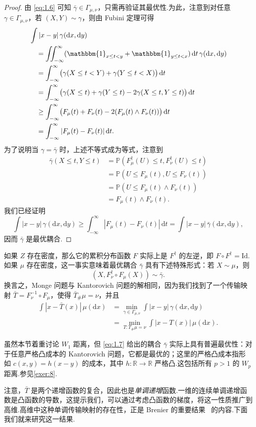 \begin{proof}
由 \eqref{eq:1.6} 可知 $\bar\gamma\in\Gamma_{\mu,\nu}$，只需再验证其最优性.为此，注意到对任意 $\gamma\in\Gamma_{\mu,\nu}$，若 $(X,Y)\sim\gamma$，则由 Fubini 定理可得
$$
\begin{aligned}
&\int|x-y|\,\gamma(\mathrm dx,\mathrm dy)\\
&\quad=\iint_{-\infty}^{\infty}
  (\mathbbm{1}_{x\le t<y}+\mathbbm{1}_{y\le t<x})\,\mathrm dt\,\gamma(\mathrm dx,\mathrm dy)\\
&\quad=\int_{-\infty}^{\infty}
  \bigl(\gamma(X\le t<Y)+\gamma(Y\le t<X)\bigr)\,\mathrm dt\\
&\quad=\int_{-\infty}^{\infty}
  \bigl(\gamma(X\le t)+\gamma(Y\le t)-2\gamma(X\le t,Y\le t)\bigr)\,\mathrm dt\\
&\quad\ge\int_{-\infty}^{\infty}
  \bigl(F_\mu(t)+F_\nu(t)-2(F_\mu(t)\wedge F_\nu(t))\bigr)\,\mathrm dt\\
&\quad=\int_{-\infty}^{\infty}|F_\mu(t)-F_\nu(t)|\,\mathrm dt.
\end{aligned}
$$
为了说明当 $\gamma=\bar\gamma$ 时，上述不等式成为等式，注意到
$$
\begin{aligned}
\bar\gamma(X\le t,Y\le t)
&=\mathbb P(F_\mu^\dagger(U)\le t,F_\nu^\dagger(U)\le t)\\
&=\mathbb P(U\le F_\mu(t),U\le F_\nu(t))\\
&=\mathbb P(U\le F_\mu(t)\wedge F_\nu(t))\\
&=F_\mu(t)\wedge F_\nu(t).
\end{aligned}
$$
我们已经证明
$$
\int|x-y|\,\gamma(\mathrm dx,\mathrm dy)
\ge\int_{-\infty}^{\infty}|F_\mu(t)-F_\nu(t)|\,\mathrm dt
=\int|x-y|\,\bar\gamma(\mathrm dx,\mathrm dy),
$$
因而 $\bar\gamma$ 是最优耦合.
\end{proof}

如果 $Z$ 存在密度，那么它的累积分布函数 $F$ 实际上是 $F^\dagger$ 的左逆，即 $F\circ F^\dagger=\mathrm{Id}$.如果 $\mu$ 存在密度，这一事实意味着最优耦合 $\bar\gamma$ 具有下述特殊形式：若 $X\sim\mu$，则
\begin{equation}\label{eq:1.7}
(X,F_\nu^\dagger\circ F_\mu(X))\sim\bar\gamma.
\end{equation}
换言之，Monge 问题与 Kantorovich 问题的解相同，因为我们找到了一个传输映射 $\bar T=F_\nu^{-1}\circ F_\mu$，使得 $\bar T_\#\mu=\nu$，并且
$$
\begin{aligned}
\int|x-\bar T(x)|\,\mu(\mathrm dx)
&=\min_{\gamma\in\Gamma_{\mu,\nu}}\int|x-y|\,\gamma(\mathrm dx,\mathrm dy)\\
&=\min_{T:T_\#\mu=\nu}\int|x-T(x)|\,\mu(\mathrm dx).
\end{aligned}
$$

虽然本节着重讨论 $W_1$ 距离，但 \eqref{eq:1.7} 给出的耦合 $\bar\gamma$ 实际上具有普遍最优性：对于任意严格凸成本的 Kantorovich 问题，它都是最优的；这里的严格凸成本指形如 $c(x,y)=h(x-y)$ 的成本，其中 $h:\mathbb R\to\mathbb R$ 严格凸.这包括所有 $p>1$ 的 $W_p$ 距离.参见\autoref{exer:8}.

注意，$\bar T$ 是两个递增函数的复合，因此也是\emph{单调递增}函数.一维的连续单调递增函数是凸函数的导数，这提示我们，可以通过考虑凸函数的梯度，将这一性质推广到高维.高维中这种单调传输映射的存在性，正是 Brenier 的重要结果~\cite{ref55} 的内容.下面我们就来研究这一结果.
